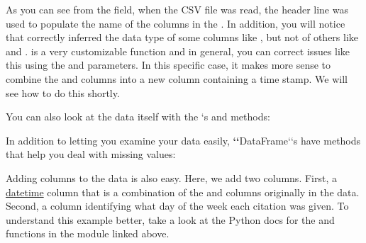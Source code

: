 As you can see from the  field, when the CSV file was read,
the header line was used to populate the name of the columns in the
. In addition, you will notice that 
correctly inferred the data type of some columns like , but not
of others like  and .  is a very
customizable function and in general, you can correct issues like this
using the  and  parameters. In this specific
case, it makes more sense to combine the  and  columns into a new column containing a time stamp. We will see
how to do this shortly.

You can also look at the data itself with the `s
 and  methods:

\begin{sphinxVerbatim}[commandchars=\\\{\}]
\end{sphinxVerbatim}

In addition to letting you examine your data easily, {\color{red}\bfseries{}{}`{}`}DataFrame{}`{}`s
have methods that help you deal with missing values:

\begin{sphinxVerbatim}[commandchars=\\\{\}]
  
\end{sphinxVerbatim}

Adding columns to the data is also easy. Here, we add two
columns. First, a \href{https://docs.python.org/2/library/datetime.html}{datetime} column that is a
combination of the  and  columns
originally in the data. Second, a column identifying what day of the
week each citation was given. To understand this example better, take
a look at the Python docs for the  and 
functions in the  module linked above.

